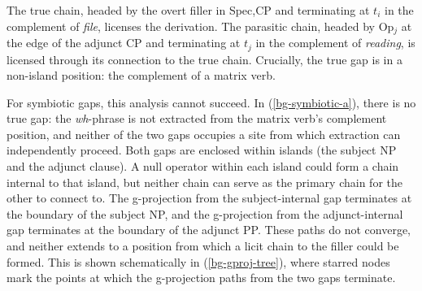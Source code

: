 \documentclass[12pt]{article}
\begin{document}
\ex\label{bg-null-op-tree}
\begin{center}
%
\end{center}
\xe

\noindent The true chain, headed by the overt filler in Spec,CP and terminating at $t_i$ in the complement of \emph{file}, licenses the derivation. The parasitic chain, headed by Op$_j$ at the edge of the adjunct CP and terminating at $t_j$ in the complement of \emph{reading}, is licensed through its connection to the true chain. Crucially, the true gap is in a non-island position: the complement of a matrix verb.

For symbiotic gaps, this analysis cannot succeed. In (\ref{bg-symbiotic-a}), there is no true gap: the \emph{wh}-phrase is not extracted from the matrix verb's complement position, and neither of the two gaps occupies a site from which extraction can independently proceed. Both gaps are enclosed within islands (the subject NP and the adjunct clause). A null operator within each island could form a chain internal to that island, but neither chain can serve as the primary chain for the other to connect to. The g-projection from the subject-internal gap terminates at the boundary of the subject NP, and the g-projection from the adjunct-internal gap terminates at the boundary of the adjunct PP. These paths do not converge, and neither extends to a position from which a licit chain to the filler could be formed. This is shown schematically in (\ref{bg-gproj-tree}), where starred nodes mark the points at which the g-projection paths from the two gaps terminate.
\end{document}
